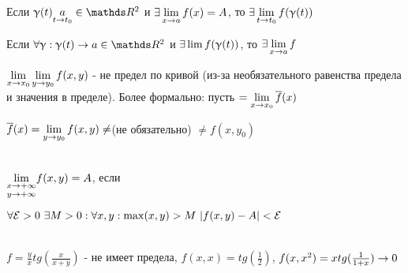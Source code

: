 \documentclass[main]{subfiles}
\begin{document}
  \begin{remark}
      Если $\upgamma(t) \us{t \ra t_0}{a} \in \R^2$ и $\exists \lim\limits_{x \rightarrow a} f(x)=A$, то $\exists \lim\limits_{t \rightarrow t_0} f(\upgamma(t))$
  \end{remark}

  \begin{remark}
      Если $\forall \upgamma: \upgamma(t) \ra a \in \R^2$ и $\exists \lim f(\upgamma(t))$, то $\exists \lim\limits_{x \rightarrow a} f$
  \end{remark}

  \begin{remark}
      $\lim\limits_{x \rightarrow x_0} \lim\limits_{y \rightarrow y_0} f(x,y)$ - не предел по кривой (из-за необязательного равенства предела и значения в пределе). Более формально: пусть $=\lim\limits_{x \rightarrow x_0} \overline{f}(x)$

      $\overline{f}(x)=\lim\limits_{y \rightarrow y_0} f(x,y) \neq$(не обязательно) $\neq f(x,y_0)$
  \end{remark}

  \begin{definition}\\
      $\underset{y \rightarrow +\infty}{\lim\limits_{x \rightarrow +\infty}} f(x,y)=A$, если

      $\forall \mathcal{E}>0 \ \exists M>0: \forall x,y: \max(x,y)>M \ |f(x,y)-A|<\mathcal{E}$
  \end{definition}

  \begin{example}\\
      $f=\frac{y}{x} tg(\frac{x}{x+y})$ - не имеет предела, $f(x,x)=tg(\frac{1}{2})$, $f(x,x^2)=x tg(\frac{1}{1+x}) \rightarrow 0$
  \end{example}
\end{document}
